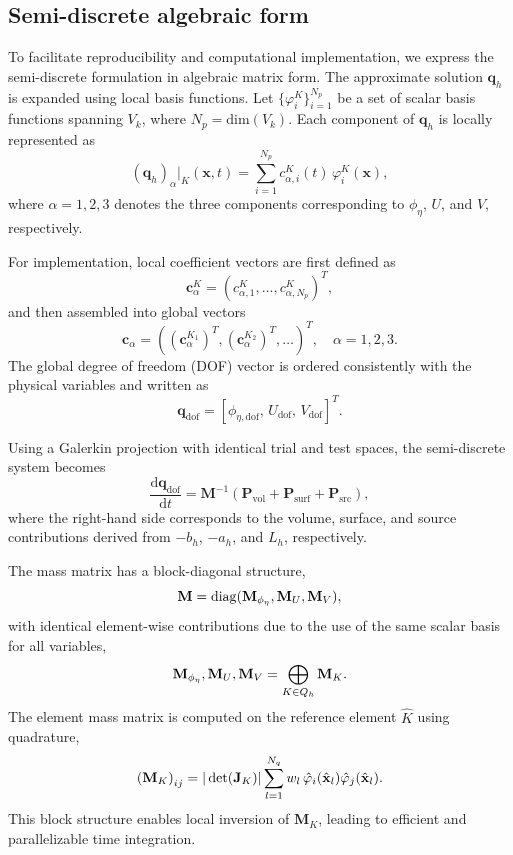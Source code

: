 \documentclass[pdflatex,sn-mathphys-num]{sn-jnl}%
\theoremstyle{thmstyleone}%
\theoremstyle{thmstyletwo}%
\theoremstyle{thmstylethree}%
\begin{document}
\subsection{Semi-discrete algebraic form}

To facilitate reproducibility and computational implementation, we express the semi-discrete formulation in algebraic matrix form. The approximate solution $\mathbf{q}_h$ is expanded using local basis functions. Let $\{\varphi_i^K\}_{i=1}^{N_p}$ be a set of scalar basis functions spanning $V_k$, where $N_p=\mathrm{dim}(V_k)$. Each component of $\mathbf{q}_h$ is locally represented as
\begin{equation}
    \left(\mathbf{q}_h\right)_\alpha|_K (\mathbf{x},t)
=
\sum_{i=1}^{N_p} c_{\alpha,i}^K(t)\,\varphi_i^K(\mathbf{x}),
\end{equation}
where $\alpha=1,2,3$ denotes the three components corresponding to $\phi_\eta$, $U$, and $V$, respectively.

For implementation, local coefficient vectors are first defined as
\[
\mathbf{c}_\alpha^K
=
(c_{\alpha,1}^K,\ldots,c_{\alpha,N_p}^K)^T,
\]
and then assembled into global vectors
\[
\mathbf{c}_\alpha
=
((\mathbf{c}_\alpha^{K_1})^T,(\mathbf{c}_\alpha^{K_2})^T,\ldots)^T,
\quad \alpha=1,2,3.
\]
The global degree of freedom (DOF) vector is ordered consistently with the physical variables and written as
\[
\mathbf{q}_{\mathrm{dof}}
=
[\phi_{\eta,\mathrm{dof}},\,U_{\mathrm{dof}},\,V_{\mathrm{dof}}]^T.
\]

Using a Galerkin projection with identical trial and test spaces, the semi-discrete system becomes
\begin{equation}
\frac{\mathrm{d}\mathbf{q}_{\mathrm{dof}}}{\mathrm{d}t}
=
\mathbf{M}^{-1}
\left(
\mathbf{P}_{\mathrm{vol}}
+
\mathbf{P}_{\mathrm{surf}}
+
\mathbf{P}_{\mathrm{src}}
\right),
\end{equation}
where the right-hand side corresponds to the volume, surface, and source contributions derived from $-b_h$, $-a_h$, and $L_h$, respectively.

The mass matrix has a block-diagonal structure,
\begin{equation}\notag
\mathbf{M}
=
\mathrm{diag}(\mathbf{M}_{\phi_\eta},\mathbf{M}_U,\mathbf{M}_V),
\end{equation}
with identical element-wise contributions due to the use of the same scalar basis for all variables,
\begin{equation}\notag
\mathbf{M}_{\phi_\eta},\mathbf{M}_U,\mathbf{M}_V
=
\bigoplus_{K\in Q_h}\mathbf{M}_K.
\end{equation}
The element mass matrix is computed on the reference element $\hat{K}$ using quadrature,
\begin{equation}\notag
\left(\mathbf{M}_K\right)_{ij}
=
|\det(\mathbf{J}_K)|
\sum_{l=1}^{N_q} w_l\,
\hat{\varphi}_i(\hat{\mathbf{x}}_l)\hat{\varphi}_j(\hat{\mathbf{x}}_l).
\end{equation}
This block structure enables local inversion of $\mathbf{M}_K$, leading to efficient and parallelizable time integration.
\end{document}
